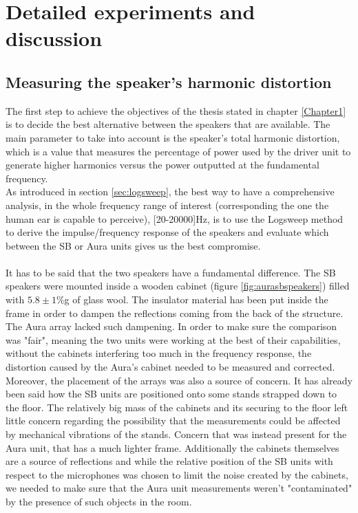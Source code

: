 \chapter{Detailed experiments and discussion} %

\label{Chapter4} %

\section{Measuring the speaker's harmonic distortion}{}
\label{subsec:sbchoosing}

The first step to achieve the objectives of the thesis stated in chapter \ref{Chapter1} is to decide the best alternative between the speakers that are available. The main parameter to take into account is the speaker's total harmonic distortion, which is a value that measures the percentage of power used by the driver unit to generate higher harmonics versus the power outputted at the fundamental frequency.
\\
As introduced in section \ref{sec:logsweep}, the best way to have a comprehensive analysis, in the whole frequency range of interest (corresponding the one the human ear is capable to perceive), [20-20000]Hz, is to use the Logsweep method to derive the impulse/frequency response of the speakers and evaluate which between the SB or Aura units gives us the best compromise.
\\
\\
It has to be said that the two speakers have a fundamental difference. The SB speakers were mounted inside a wooden cabinet (figure \ref{fig:aurasbspeakers}) filled with $5.8\pm1\%$g of glass wool. The insulator material has been put inside the frame in order to dampen the reflections coming from the back of the structure. The Aura array lacked such dampening. In order to make sure the comparison was "fair", meaning the two units were working at the best of their capabilities, without the cabinets interfering too much in the frequency response, the distortion caused by the Aura's cabinet needed to be measured and corrected.
\\
Moreover, the placement of the arrays was also a source of concern. It has already been said how the SB units are positioned onto some stands strapped down to the floor. The relatively big mass of the cabinets and its securing to the floor left little concern regarding the possibility that the measurements could be affected by mechanical vibrations of the stands. Concern that was instead present for the Aura unit, that has a much lighter frame. Additionally the cabinets themselves are a source of reflections and while the relative position of the SB units with respect to the microphones was chosen to limit the noise created by the cabinets, we needed to make sure that the Aura unit measurements weren't "contaminated" by the presence of such objects in the room. 
